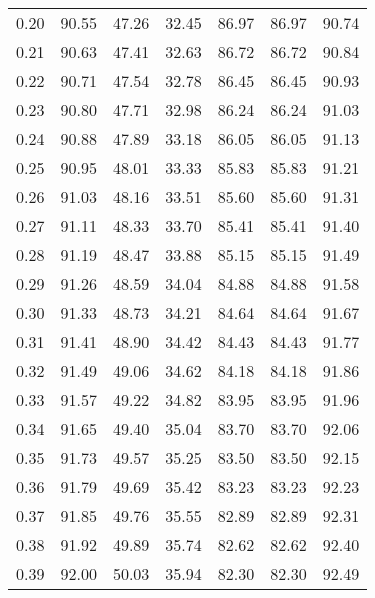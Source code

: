 \begin{tabular}{|c|c|c|c|c|c|c|}
      0.20 &     90.55 &     47.26 &      32.45 &   86.97 &      86.97 &         90.74 \\
      0.21 &     90.63 &     47.41 &      32.63 &   86.72 &      86.72 &         90.84 \\
      0.22 &     90.71 &     47.54 &      32.78 &   86.45 &      86.45 &         90.93 \\
      0.23 &     90.80 &     47.71 &      32.98 &   86.24 &      86.24 &         91.03 \\
      0.24 &     90.88 &     47.89 &      33.18 &   86.05 &      86.05 &         91.13 \\
      0.25 &     90.95 &     48.01 &      33.33 &   85.83 &      85.83 &         91.21 \\
      0.26 &     91.03 &     48.16 &      33.51 &   85.60 &      85.60 &         91.31 \\
      0.27 &     91.11 &     48.33 &      33.70 &   85.41 &      85.41 &         91.40 \\
      0.28 &     91.19 &     48.47 &      33.88 &   85.15 &      85.15 &         91.49 \\
      0.29 &     91.26 &     48.59 &      34.04 &   84.88 &      84.88 &         91.58 \\
      0.30 &     91.33 &     48.73 &      34.21 &   84.64 &      84.64 &         91.67 \\
      0.31 &     91.41 &     48.90 &      34.42 &   84.43 &      84.43 &         91.77 \\
      0.32 &     91.49 &     49.06 &      34.62 &   84.18 &      84.18 &         91.86 \\
      0.33 &     91.57 &     49.22 &      34.82 &   83.95 &      83.95 &         91.96 \\
      0.34 &     91.65 &     49.40 &      35.04 &   83.70 &      83.70 &         92.06 \\
      0.35 &     91.73 &     49.57 &      35.25 &   83.50 &      83.50 &         92.15 \\
      0.36 &     91.79 &     49.69 &      35.42 &   83.23 &      83.23 &         92.23 \\
      0.37 &     91.85 &     49.76 &      35.55 &   82.89 &      82.89 &         92.31 \\
      0.38 &     91.92 &     49.89 &      35.74 &   82.62 &      82.62 &         92.40 \\
      0.39 &     92.00 &     50.03 &      35.94 &   82.30 &      82.30 &         92.49 \\

\end{tabular}
